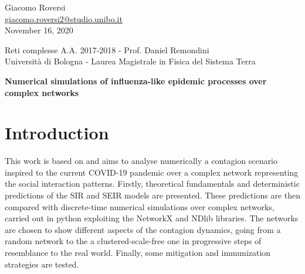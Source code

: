 \documentclass[DIV=12, BCOR=0pt]{scrartcl}  %
\begin{document}
%	
%



\begin{flushright}
	{\large Giacomo Roversi} \\ 
	{\small \href{mailto:giacomo.roversi2@studio.unibo.it}{giacomo.roversi2@studio.unibo.it} }\\
	\vskip0.15in
	{\large November 16, 2020}
\end{flushright}

\begin{flushleft}
	{\Large \color{gray}
		Reti complesse A.A. 2017-2018 - Prof. Daniel Remondini  \\
		Università di Bologna - Laurea Magistrale in Fisica del Sistema Terra}


	\vskip0.2in
	{\huge\textbf{Numerical simulations of influenza-like epidemic processes over complex networks}} 
	\vskip0.33in
	
\end{flushleft}
	
	\section{Introduction}
	\label{sec:intro}
	This work is based on \citet{Pastor-Satorras} %
	and aims to analyse numerically a contagion scenario inspired to the current COVID-19 pandemic over a complex network representing the social interaction patterns. 
 	Firstly, theoretical fundamentals and deterministic predictions of the SIR and SEIR models are presented. These predictions are then compared with discrete-time numerical simulations over complex networks, carried out in python exploiting the NetworkX and NDlib libraries. The networks are chosen to show different aspects of the contagion dynamics, going from a random network to the a clustered-scale-free one in progressive steps of resemblance to the real world. 
 	Finally, some mitigation and immunization strategies are tested.
  
\end{document}
